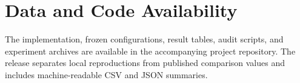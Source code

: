 \documentclass[preprint,12pt]{elsarticle}
\begin{document}
\section*{Data and Code Availability}

The implementation, frozen configurations, result tables, audit scripts, and experiment archives are available in the accompanying project repository. The release separates local reproductions from published comparison values and includes machine-readable CSV and JSON summaries.



\end{document}
